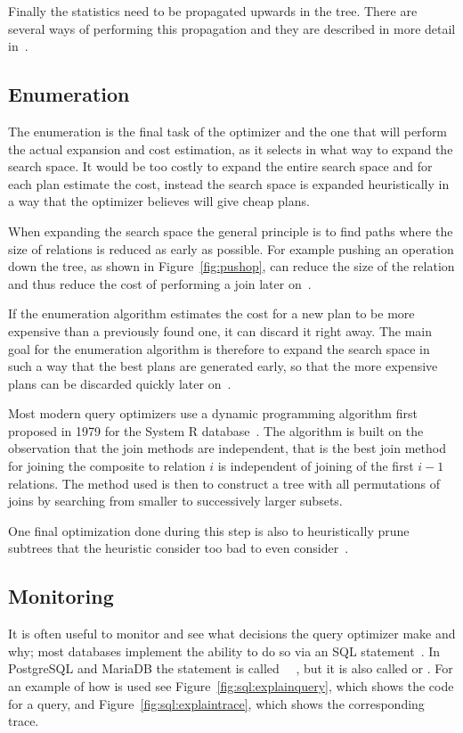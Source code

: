 Finally the statistics need to be propagated upwards in the tree. There are several ways of performing this propagation and they are described in more detail in~\cite{chaudhuri_1998_overview_aooqoirs}.

\subsection{Enumeration}
The enumeration is the final task of the optimizer and the one that will perform the actual expansion and cost estimation, as it selects in what way to expand the search space. It would be too costly to expand the entire search space and for each plan estimate the cost, instead the search space is expanded heuristically in a way that the optimizer believes will give cheap plans.

When expanding the search space the general principle is to find paths where the size of relations is reduced as early as possible. For example pushing an operation down the tree, as shown in Figure~\ref{fig:pushop}, can reduce the size of the relation and thus reduce the cost of performing a join later on~\cite[p. 772-774]{garcia-molina_2002_database_dstcb}.

If the enumeration algorithm estimates the cost for a new plan to be more expensive than a previously found one, it can discard it right away. The main goal for the enumeration algorithm is therefore to expand the search space in such a way that the best plans are generated early, so that the more expensive plans can be discarded quickly later on~\cite{nica_2012_analyzing_aqoppojea}.

Most modern query optimizers use a dynamic programming algorithm first proposed in 1979 for the System R database~\cite{selinger_1979_access_apsiardms}. The algorithm is built on the observation that the join methods are independent, that is the best join method for joining the composite to relation $i$ is independent of joining of the first $i-1$ relations. The method used is then to construct a tree with all permutations of joins by searching from smaller to successively larger subsets.

One final optimization done during this step is also to heuristically prune subtrees that the heuristic consider too bad to even consider~\cite{ono_1990_measuring_mtcojeiqo}.

\subsection{Monitoring}
It is often useful to monitor and see what decisions the query optimizer make and why; most databases implement the ability to do so via an SQL statement~\cite[p. 34]{lahdenmaki_2005_relational_rdidatodossea}. In PostgreSQL and MariaDB the statement is called ~\cite{postgresql_pd9e}~\cite{explain_emkb}, but it is also called  or . For an example of how  is used see Figure~\ref{fig:sql:explainquery}, which shows the code for a query, and Figure~\ref{fig:sql:explaintrace}, which shows the corresponding trace.

